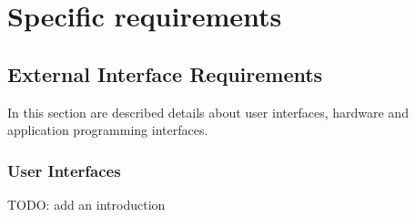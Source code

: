 \section{Specific requirements}

\subsection{External Interface Requirements}
In this section are described details about user interfaces, hardware and application programming interfaces.

\subsubsection{User Interfaces}
TODO: add an introduction
\begin{figure}[H]
    \centering
\end{figure}
